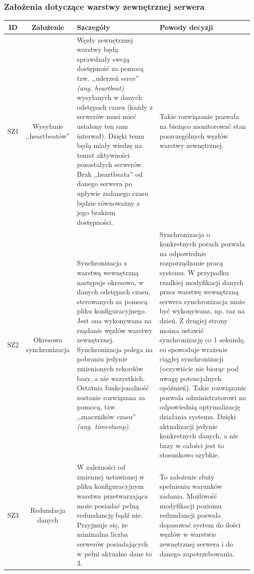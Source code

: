 \begin{center}
\subsubsection*[Założenia dotyczące warstwy zewnętrznej serwera]{Założenia dotyczące warstwy zewnętrznej serwera} \label{z:sz}

\begin{tabular}{|c|c|l|l|}
\hline
\textbf{ID} & \textbf{Założenie} & \textbf{Szczegóły} & \textbf{Powody decyzji} \\
\hline
\label{z:sz1} SZ1 & Wysyłanie ,,heartbeatów'' &  Węzły zewnętrznej warstwy będą sprawdzały swoją dostępność za pomocą tzw. ,,uderzeń serce'' \textit{(ang. heartbeat)} wysyłanych w danych odstępach czasu (każdy z serwerów musi mieć ustalony ten sam interwał). Dzięki temu będą miały wiedzę na temat aktywności pozostałych serwerów. Brak ,,heartbeata'' od danego serwera po upływie zadanego czasu będzie równoważny z jego brakiem dostępności. & Takie rozwiązanie pozwala na bieżąco monitorować stan poszczególnych węzłów warstwy zewnętrznej. \\
\hline
\label{z:sz2} SZ2 & Okresowa synchronizacja & Synchronizacja z warstwą wewnętrzną następuje okresowo, w danych odstępach czasu, sterowanych za pomocą pliku konfiguracyjnego. Jest ona wykonywana na rządanie węzłów warstwy zewnętrznej. Synchronizacja polega na pobraniu jedynie zmienionych rekordów bazy, a nie wszystkich. Ostatnia funkcjonalność zostanie rozwiązana za pomocą, tzw. ,,znaczników czasu'' \textit{(ang. timestamp)}. & Synchronizacja o konkretnych porach pozwala na odpowiednie rozporządzanie pracą systemu. W przypadku rzadkiej modyfikacji danych przez warstwę wewnętrzną serwera synchronizacja może być wykonywana, np. raz na dzień. Z drugiej strony można ustawić synchronizację co 1 sekundę, co spowoduje wrażenie ciągłej synchronizacji (oczywiście nie biorąc pod uwagę potencjalnych opóźnień). Takie rozwiązanie pozwala administratorowi na odpowiednią optymalizację działania systemu. Dzięki aktualizacji jedynie konkretnych danych, a nie bazy w całości jest to stosunkowo szybkie. \\
\hline
\label{z:sz3} SZ3 & Redundacja danych & W zależności od zmiennej ustawionej w pliku konfiguracyjnym warstwa przetwarzająca może posiadać pełną redundancję bądź nie. Przyjmuje się, że minimalna liczba serwerów posiadających w pełni aktualne dane to 3. & To założenie służy spełnieniu warunków zadania. Możliwość modyfikacji poziomu redundancji pozwala dopasować system do ilości węzłów w warstwie zewnętrznej serwera i do danego zapotrzebowania.\\

\end{tabular}
\end{center}
